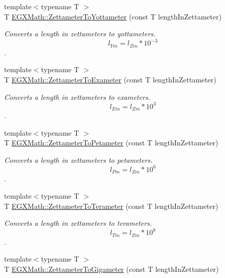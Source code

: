\begin{DoxyCompactItemize}
{\footnotesize template$<$typename T $>$ }\\T \mbox{\hyperlink{group___e_g_x_math-_conversions-_length_conversions-_s_i-_zettameter-_s_i_ga50b4ccf902ce36f4519ce580bf2234d4}{E\+G\+X\+Math\+::\+Zettameter\+To\+Yottameter}} (const T length\+In\+Zettameter)
\begin{DoxyCompactList}\small\item\em Converts a length in zettameters to yottameters. \[ l_{Ym}=l_{Zm} * 10^{-3} \]. \end{DoxyCompactList}\item 
{\footnotesize template$<$typename T $>$ }\\T \mbox{\hyperlink{group___e_g_x_math-_conversions-_length_conversions-_s_i-_zettameter-_s_i_ga7d9638e3c012b4ff3ad3dc0e0f0393b2}{E\+G\+X\+Math\+::\+Zettameter\+To\+Exameter}} (const T length\+In\+Zettameter)
\begin{DoxyCompactList}\small\item\em Converts a length in zettameters to exameters. \[ l_{Em}=l_{Zm} * 10^{3} \]. \end{DoxyCompactList}\item 
{\footnotesize template$<$typename T $>$ }\\T \mbox{\hyperlink{group___e_g_x_math-_conversions-_length_conversions-_s_i-_zettameter-_s_i_ga85af5c37065cd355ac23b12a4f7b16f5}{E\+G\+X\+Math\+::\+Zettameter\+To\+Petameter}} (const T length\+In\+Zettameter)
\begin{DoxyCompactList}\small\item\em Converts a length in zettameters to petameters. \[ l_{Pm}=l_{Zm} * 10^{6} \]. \end{DoxyCompactList}\item 
{\footnotesize template$<$typename T $>$ }\\T \mbox{\hyperlink{group___e_g_x_math-_conversions-_length_conversions-_s_i-_zettameter-_s_i_ga16dfe32824b09a16e5af4a6f663c0f38}{E\+G\+X\+Math\+::\+Zettameter\+To\+Terameter}} (const T length\+In\+Zettameter)
\begin{DoxyCompactList}\small\item\em Converts a length in zettameters to terameters. \[ l_{Tm}=l_{Zm} * 10^{9} \]. \end{DoxyCompactList}\item 
{\footnotesize template$<$typename T $>$ }\\T \mbox{\hyperlink{group___e_g_x_math-_conversions-_length_conversions-_s_i-_zettameter-_s_i_gab6673b4fa72a1c196d7fba1260e7f78a}{E\+G\+X\+Math\+::\+Zettameter\+To\+Gigameter}} (const T length\+In\+Zettameter)

\end{DoxyCompactItemize}
